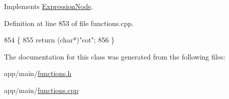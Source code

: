 Implements \hyperlink{classExpressionNode_a42a5e9562b0f645a19dcc83f698069b5}{Expression\+Node}.



Definition at line 853 of file functions.\+cpp.


\begin{DoxyCode}
854 \{
855     \textcolor{keywordflow}{return} (\textcolor{keywordtype}{char}*)\textcolor{stringliteral}{"cot"};
856 \}
\end{DoxyCode}


The documentation for this class was generated from the following files\+:\begin{DoxyCompactItemize}
\item 
app/main/\hyperlink{functions_8h}{functions.\+h}\item 
app/main/\hyperlink{functions_8cpp}{functions.\+cpp}\end{DoxyCompactItemize}
